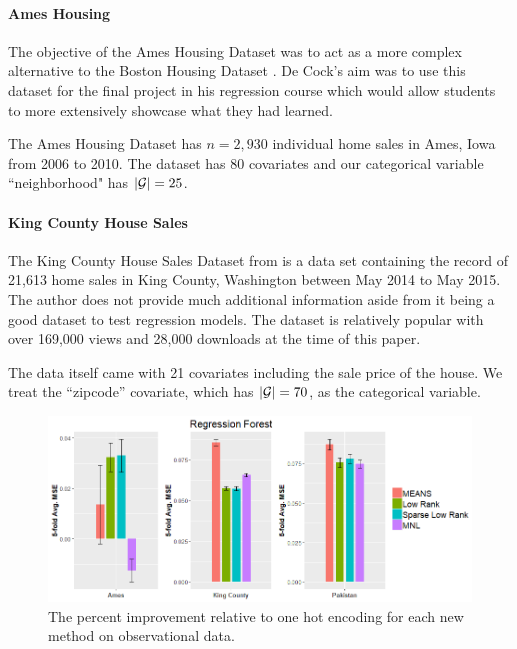 \documentclass{article}
\theoremstyle{plain}
\theoremstyle{definition}
\theoremstyle{remark}
\begin{document}
\paragraph{Ames Housing}

The objective of the Ames Housing Dataset \cite{de2011ames} was to act as a more complex alternative to the Boston Housing Dataset \cite{harrison1978hedonic}. De Cock's aim was to use this dataset for the final project in his regression course which would allow students to more extensively showcase what they had learned.

The Ames Housing Dataset has $n=2,930$ individual home sales in Ames, Iowa from 2006 to 2010. The dataset has 80 covariates and our categorical variable ``neighborhood" has $|\mathcal{G}|=25$.

\paragraph{King County House Sales}

The King County House Sales Dataset from \cite{houseSalesKingCounty} is a data set containing the record of 21,613 home sales in King County, Washington between May 2014 to May 2015. The author does not provide much additional information aside from it being a good dataset to test regression models. The dataset is relatively popular with over 169,000 views and 28,000 downloads at the time of this paper.

The data itself came with 21 covariates including the sale price of the house. We treat the ``zipcode'' covariate, which has $|\mathcal{G}|=70$, as the categorical variable.

\begin{figure}[htp]
  \centering
  \includegraphics[scale=0.6]{figures/rf_real_data_with_196se.png}
  \caption {The percent improvement relative to one hot encoding for each new method on observational data.}
  \label{tab:rf_sim_setups}
\end{figure}
\end{document}
